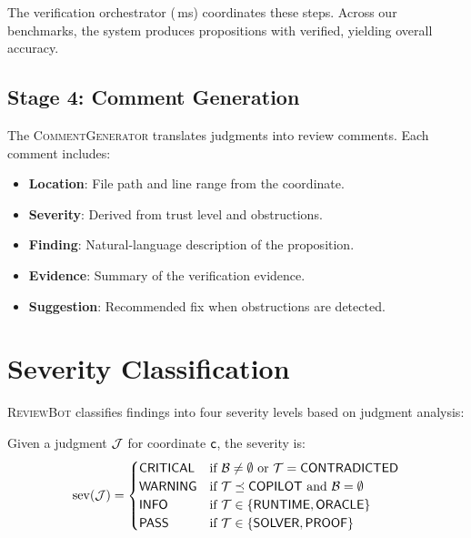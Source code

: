 \documentclass[11pt]{article}
\newcommand{\ReviewBot}{\textsc{ReviewBot}}
\newcommand{\CommentGen}{\textsc{CommentGenerator}}
\newcommand{\Severity}{\mathrm{sev}}
\newcommand{\SevCritical}{\mathsf{CRITICAL}}
\newcommand{\SevWarning}{\mathsf{WARNING}}
\newcommand{\SevInfo}{\mathsf{INFO}}
\newcommand{\SevPass}{\mathsf{PASS}}
\begin{document}
The verification orchestrator (\compProfOrchestrateVerificationMeanMs{}\,ms)
coordinates these steps. Across our benchmarks, the system produces
\compPropsSum{} propositions with \compPropsOkSum{} verified, yielding
\compOverallAccuracy{} overall accuracy.

\subsection{Stage 4: Comment Generation}

The \CommentGen{} translates judgments into review comments. Each comment
includes:
\begin{itemize}[leftmargin=*]
  \item \textbf{Location}: File path and line range from the coordinate.
  \item \textbf{Severity}: Derived from trust level and obstructions.
  \item \textbf{Finding}: Natural-language description of the proposition.
  \item \textbf{Evidence}: Summary of the verification evidence.
  \item \textbf{Suggestion}: Recommended fix when obstructions are detected.
\end{itemize}

\section{Severity Classification}\label{sec:severity}

\ReviewBot{} classifies findings into four severity levels based on judgment
analysis:

\begin{definition}
Given a judgment $\mathcal{J}$ for coordinate $\mathsf{c}$, the severity is:
\[
  \Severity(\J) = \begin{cases}
    \SevCritical & \text{if } \obstr \neq \emptyset \text{ or }
                    \trust = \Tcontra \\
    \SevWarning  & \text{if } \trust \tleq \Tcopilot \text{ and }
                    \obstr = \emptyset \\
    \SevInfo     & \text{if } \trust \in \{\Truntime, \Toracle\} \\
    \SevPass     & \text{if } \trust \in \{\Tsolver, \Tproof\}
  \end{cases}
\]
\end{definition}
\end{document}
